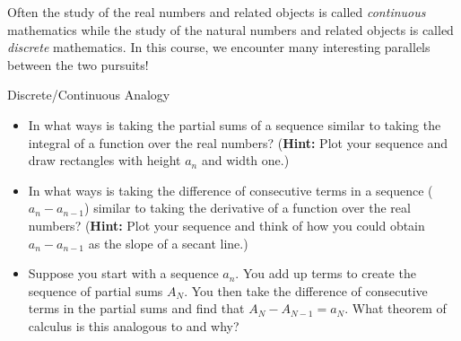Often the study of the real numbers and related objects is called \emph{continuous} mathematics while the study of the natural numbers and related objects is called \emph{discrete} mathematics.  In this course, we encounter many interesting parallels between the two pursuits!

\begin{exercise}{Discrete/Continuous Analogy \Coffeecup \Coffeecup \Coffeecup \Coffeecup}
\begin{itemize}
\item In what ways is taking the partial sums of a sequence similar to taking the integral of a function over the real numbers?  ({\bf Hint:} Plot your sequence and draw rectangles with height $a_n$ and width one.)
\vspace*{1in}
\item In what ways is taking the difference of consecutive terms in a sequence ($a_{n}-a_{n-1}$) similar to taking the derivative of a function over the real numbers?  ({\bf Hint: } Plot your sequence and think of how you could obtain $a_{n}-a_{n-1}$ as the slope of a secant line.)
\vspace*{1in}
\item Suppose you start with a sequence $a_n$.  You add up terms to create the sequence of partial sums $A_N$.  You then take the difference of consecutive terms in the partial sums and find that $A_{N}-A_{N-1}=a_N$.  What theorem of calculus is this analogous to and why?  
\vspace*{1in}
\end{itemize}
\end{exercise}